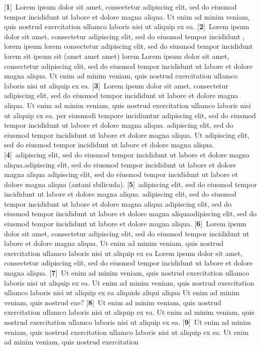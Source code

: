 \documentclass[10pt, twoside]{book}
\newcommand{\bv}[1]{\linenumannotation{#1}[\textbf{#1}]}
\begin{document}
\beginnumbering
\pstart
\bv{1}~Lorem ipsum dolor sit amet, consectetur adipiscing elit, sed do eiusmod tempor incididunt ut labore et dolore magna aliqua. Ut enim ad minim veniam, quis nostrud exercitation ullamco laboris nisi ut aliquip ex ea. \bv{2}~Lorem ipsum dolor sit amet, consectetur adipiscing elit, sed do eiusmod tempor incididunt , lorem ipsum lorem  consectetur adipiscing elit, sed do eiusmod tempor incididunt  lorem sit ipsum sit (amet amet amet) lorem  Lorem ipsum dolor sit amet, consectetur adipiscing elit, sed do eiusmod tempor incididunt ut labore et dolore magna aliqua. Ut enim ad minim veniam, quis nostrud exercitation ullamco laboris nisi ut aliquip ex ea. \bv{3}~Lorem ipsum dolor sit amet, consectetur adipiscing elit, sed do eiusmod tempor incididunt ut labore et dolore magna aliqua. Ut enim ad minim veniam, quis nostrud exercitation ullamco laboris nisi ut aliquip ex ea.  per  eiusmodi tempore incidiuntur  adipiscing elit, sed do eiusmod tempor incididunt ut labore et dolore magna aliqua. adipiscing elit, sed do eiusmod tempor incididunt ut labore et dolore magna aliqua. Ut  adipiscing elit, sed do eiusmod tempor incididunt ut labore et dolore magna aliqua. \bv{4}~adipiscing elit, sed do eiusmod tempor incididunt ut labore et dolore magna aliqua.adipiscing elit, sed do eiusmod tempor incididunt ut labore et dolore magna aliqua  adipiscing elit, sed do eiusmod tempor incididunt ut labore et dolore magna aliqua  (antani sbilicuda). \bv{5}~adipiscing elit, sed do eiusmod tempor incididunt ut labore et dolore magna aliqua. adipiscing elit, sed do eiusmod tempor incididunt ut labore et dolore magna aliqua  adipiscing elit, sed do eiusmod tempor incididunt ut labore et dolore magna aliquaadipiscing elit, sed do eiusmod tempor incididunt ut labore et dolore magna aliqua. \bv{6}~Lorem ipsum dolor sit amet, consectetur adipiscing elit, sed do eiusmod tempor incididunt ut labore et dolore magna aliqua. Ut enim ad minim veniam, quis nostrud exercitation ullamco laboris nisi ut aliquip ex ea  Lorem ipsum dolor sit amet, consectetur adipiscing elit, sed do eiusmod tempor incididunt ut labore et dolore magna aliqua. \bv{7}~Ut enim ad minim veniam, quis nostrud exercitation ullamco laboris nisi ut aliquip ex ea. Ut enim ad minim veniam, quis nostrud exercitation ullamco laboris nisi ut aliquip ex ea  aliquids aliqui aliqua Ut enim ad minim veniam, quis nostrud exe? \bv{8}~Ut enim ad minim veniam, quis nostrud exercitation ullamco laboris nisi ut aliquip ex ea. Ut enim ad minim veniam, quis nostrud exercitation ullamco laboris nisi ut aliquip ex ea. \bv{9}~Ut enim ad minim veniam, quis nostrud exercitation ullamco laboris nisi ut aliquip ex ea. Ut enim ad minim veniam, quis nostrud exercitation 
\end{document}
